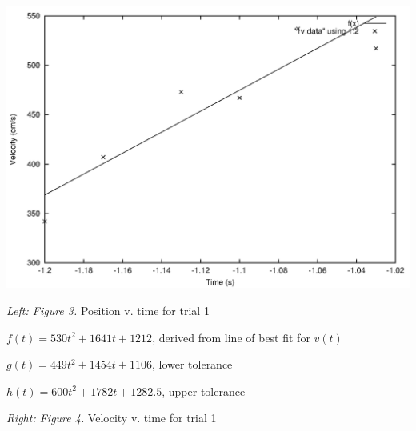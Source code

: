 \documentclass[12pt,letterpaper]{article}
\begin{document}
\includegraphics[scale=0.6]{1v.png}

\textit{Left: Figure 3.} Position v. time for trial 1

\(f(t) = 530t^2 + 1641t + 1212\), derived from line of best fit for \(v(t)\)

\(g(t) = 449t^2 + 1454t + 1106\), lower tolerance

\(h(t) = 600t^2 + 1782t + 1282.5\), upper tolerance

\textit{Right: Figure 4.} Velocity v. time for trial 1 
\end{document}
